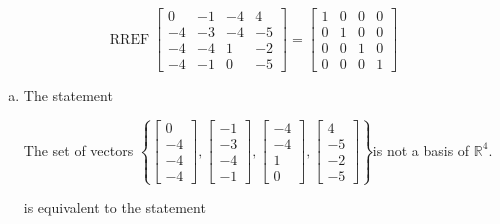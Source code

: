 \begin{exerciseAnswer} 


\[\operatorname{RREF} \left[\begin{array}{cccc}
0 & -1 & -4 & 4 \\
-4 & -3 & -4 & -5 \\
-4 & -4 & 1 & -2 \\
-4 & -1 & 0 & -5
\end{array}\right] = \left[\begin{array}{cccc}
1 & 0 & 0 & 0 \\
0 & 1 & 0 & 0 \\
0 & 0 & 1 & 0 \\
0 & 0 & 0 & 1
\end{array}\right] \]


\begin{enumerate}[(a)]
\item The statement 
\begin{center}\begin{minipage}{0.8\textwidth}
 The set of vectors \( \left\{ \left[\begin{array}{c}
0 \\
-4 \\
-4 \\
-4
\end{array}\right] , \left[\begin{array}{c}
-1 \\
-3 \\
-4 \\
-1
\end{array}\right] , \left[\begin{array}{c}
-4 \\
-4 \\
1 \\
0
\end{array}\right] , \left[\begin{array}{c}
4 \\
-5 \\
-2 \\
-5
\end{array}\right] \right\} \)is not a basis of \(\mathbb{R}^4\). 
\end{minipage}\end{center}
     is equivalent to the statement 
\begin{center}\begin{minipage}{0.8\textwidth}
 The set of vectors \( \left\{ \left[\begin{array}{c}
0 \\
-4 \\

\end{array}
\end{minipage}
\end{center}
\end{enumerate}
\end{exerciseAnswer}
